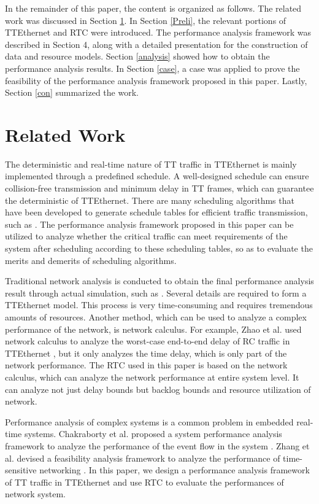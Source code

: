 \documentclass[electronics,article,accept,moreauthors,pdftex]{Definitions/mdpi}
\begin{document}
In the remainder of this paper, the content is organized as follows.
The related work was discussed in Section \ref{related}. In Section \ref{Preli}, the relevant portions of TTEthernet and RTC were introduced. The performance analysis framework was described in Section 4, along with a detailed presentation for the construction of data and resource models. Section \ref{analysis} showed how to obtain the performance analysis results. In Section \ref{case}, a case was applied to prove the feasibility of the performance analysis framework proposed in this paper.
Lastly, Section \ref{con} {summarized} the work.

\section{Related Work}
\label{related}
The deterministic and real-time nature of TT traffic in TTEthernet is mainly implemented through a predefined schedule. A well-designed schedule can ensure collision-free transmission and minimum delay in TT frames, which can guarantee the deterministic of TTEthernet. There are many scheduling algorithms that have been developed to generate schedule tables for efficient traffic transmission, such as \cite{suethanuwong2012scheduling,craciunas2014optimal,zhang2018imporosity}. The performance analysis framework proposed in this paper can be utilized to analyze whether the critical traffic can meet requirements of the system after scheduling according to these scheduling tables, so as to evaluate the merits and demerits of scheduling algorithms.


Traditional network analysis is conducted to obtain the final performance analysis result through actual simulation, such as \cite{abuteir2015scheduling}. Several details are required to form a TTEthernet model. This process is very time-consuming and requires tremendous amounts of resources. Another method, which can be used to analyze a complex performance of the network, is network calculus. For example, Zhao et al. used network calculus to analyze the worst-case end-to-end delay of RC traffic in TTEthernet \cite{zhao2017timing}, but it only analyzes the time delay, which is only part of the network performance. The RTC used in this paper is based on the network calculus, which can analyze the network performance at entire system level. It can analyze not just delay bounds but backlog bounds and resource utilization of network.

Performance analysis of complex systems is a common problem in embedded real-time systems. Chakraborty et al. proposed a system performance analysis framework to analyze the performance of the event flow in the system \cite{chakraborty2003general}. Zhang et al. devised a feasibility analysis framework to analyze the performance of time-sensitive networking \cite{zhang2019feasibility}. In this paper, we design a performance analysis framework of TT traffic in TTEthernet and use RTC to evaluate the performances of network system.
\end{document}
